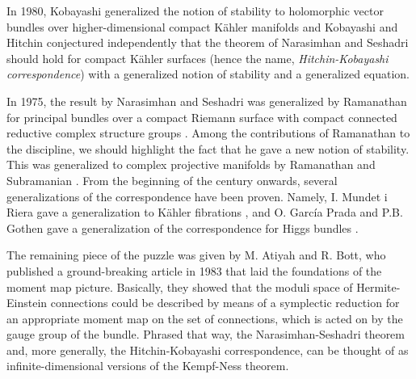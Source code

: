 In 1980, Kobayashi generalized the notion of stability to holomorphic vector bundles over higher-dimensional compact Kähler manifolds and Kobayashi and Hitchin conjectured independently that the theorem of Narasimhan and Seshadri should hold for compact Kähler surfaces (hence the name, \textit{Hitchin-Kobayashi correspondence}) with a generalized notion of stability and a generalized equation.

In 1975, the result by Narasimhan and Seshadri was generalized by Ramanathan for principal bundles over a compact Riemann surface with compact connected reductive complex structure groups \parencite{ramanathan1975stable}. Among the contributions of Ramanathan to the discipline, we should highlight the fact that he gave a new notion of stability. This was generalized to complex projective manifolds by Ramanathan and Subramanian \parencite{SubramanianRamanathan}. From the beginning of the century onwards, several generalizations of the correspondence have been proven. Namely, I. Mundet i Riera gave a generalization to Kähler fibrations \parencite{i1999hitchin}, and O. García Prada and P.B. Gothen gave a generalization of the correspondence for Higgs bundles \parencite{garcia2009hitchin}.    

The remaining piece of the puzzle was given by M. Atiyah and R. Bott, who published a ground-breaking article \parencite{atiyah1983yang} in 1983 that laid the foundations of the moment map picture. Basically, they showed that the moduli space of Hermite-Einstein connections could be described by means of a symplectic reduction for an appropriate moment map on the set of connections, which is acted on by the gauge group of the bundle. Phrased that way, the Narasimhan-Seshadri theorem and, more generally, the Hitchin-Kobayashi correspondence, can be thought of as infinite-dimensional versions of the Kempf-Ness theorem.

